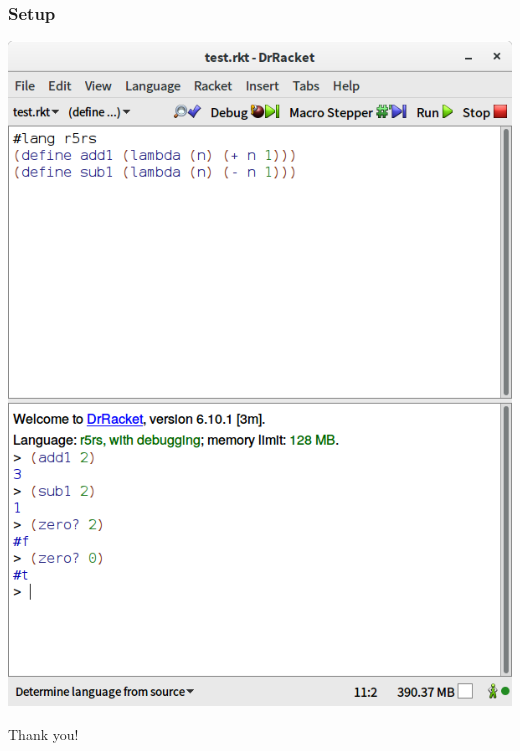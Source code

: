 \documentclass[xcolor=pdftex,dvipsnames,table]{beamer}
\begin{document}
\begin{frame}
  \frametitle{Setup}
  \begin{center}
    \includegraphics[height=0.8\textheight]{screenshot}
  \end{center}
\end{frame}




\begin{frame}
  \begin{center}
    \huge{Thank you!}
  \end{center}
\end{frame}
\end{document}

